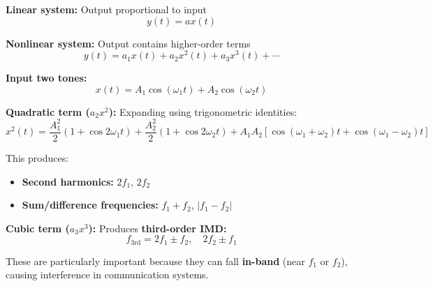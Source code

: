 \textbf{Linear system:} Output proportional to input
\begin{equation}
\label{eq:linear-system}
y(t) = a x(t)
\end{equation}

\textbf{Nonlinear system:} Output contains higher-order terms
\begin{equation}
\label{eq:nonlinear-system}
y(t) = a_1 x(t) + a_2 x^2(t) + a_3 x^3(t) + \cdots
\end{equation}

\textbf{Input two tones:}
\begin{equation}
\label{eq:two-tone-input}
x(t) = A_1 \cos(\omega_1 t) + A_2 \cos(\omega_2 t)
\end{equation}

\textbf{Quadratic term ($a_2 x^2$):} Expanding using trigonometric identities:
\begin{equation}
\label{eq:quadratic-expansion}
x^2(t) = \frac{A_1^2}{2} (1 + \cos 2\omega_1 t) + \frac{A_2^2}{2} (1 + \cos 2\omega_2 t) + A_1 A_2 [\cos(\omega_1 + \omega_2)t + \cos(\omega_1 - \omega_2)t]
\end{equation}

This produces:
\begin{itemize}
\item \textbf{Second harmonics:} $2f_1$, $2f_2$
\item \textbf{Sum/difference frequencies:} $f_1 + f_2$, $|f_1 - f_2|$
\end{itemize}

\textbf{Cubic term ($a_3 x^3$):} Produces \textbf{third-order IMD:}
\begin{equation}
\label{eq:third-order-imd}
f_{3\text{rd}} = 2f_1 \pm f_2, \quad 2f_2 \pm f_1
\end{equation}

These are particularly important because they can fall \textbf{in-band} (near $f_1$ or $f_2$), causing interference in communication systems.

\begin{center}
\end{center}


